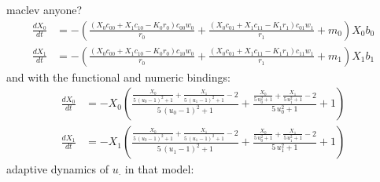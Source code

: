 \documentclass{article}
\begin{document}
maclev anyone? 
\[\begin{align*}
\frac{dX_{0}}{dt} &= -{\left(\frac{{\left(X_{0} c_{00} + X_{1} c_{10} - K_{0} r_{0}\right)} c_{00} w_{0}}{r_{0}} + \frac{{\left(X_{0} c_{01} + X_{1} c_{11} - K_{1} r_{1}\right)} c_{01} w_{1}}{r_{1}} + m_{0}\right)} X_{0} b_{0}\\
\frac{dX_{1}}{dt} &= -{\left(\frac{{\left(X_{0} c_{00} + X_{1} c_{10} - K_{0} r_{0}\right)} c_{10} w_{0}}{r_{0}} + \frac{{\left(X_{0} c_{01} + X_{1} c_{11} - K_{1} r_{1}\right)} c_{11} w_{1}}{r_{1}} + m_{1}\right)} X_{1} b_{1}
\end{align*} \
\]
and with the functional and numeric bindings: 
\[\begin{align*}
\frac{dX_{0}}{dt} &= -X_{0} {\left(\frac{\frac{X_{0}}{5 \, {\left(u_{0} - 1\right)}^{2} + 1} + \frac{X_{1}}{5 \, {\left(u_{1} - 1\right)}^{2} + 1} - 2}{5 \, {\left(u_{0} - 1\right)}^{2} + 1} + \frac{\frac{X_{0}}{5 \, u_{0}^{2} + 1} + \frac{X_{1}}{5 \, u_{1}^{2} + 1} - 2}{5 \, u_{0}^{2} + 1} + 1\right)}\\
\frac{dX_{1}}{dt} &= -X_{1} {\left(\frac{\frac{X_{0}}{5 \, {\left(u_{0} - 1\right)}^{2} + 1} + \frac{X_{1}}{5 \, {\left(u_{1} - 1\right)}^{2} + 1} - 2}{5 \, {\left(u_{1} - 1\right)}^{2} + 1} + \frac{\frac{X_{0}}{5 \, u_{0}^{2} + 1} + \frac{X_{1}}{5 \, u_{1}^{2} + 1} - 2}{5 \, u_{1}^{2} + 1} + 1\right)}
\end{align*} \
\]
adaptive dynamics of $u_\cdot$ in that model:
\end{document}
